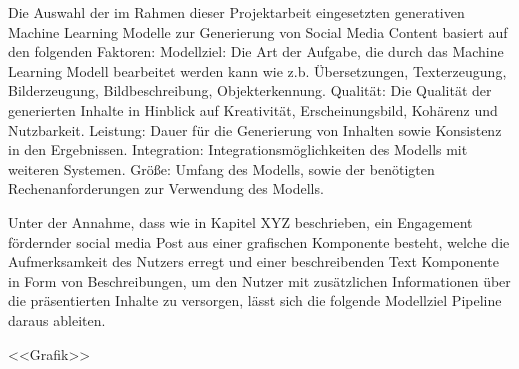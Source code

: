 Die Auswahl der im Rahmen dieser Projektarbeit eingesetzten generativen Machine Learning Modelle zur Generierung von Social Media Content basiert auf den folgenden Faktoren:
Modellziel: Die Art der Aufgabe, die durch das Machine Learning Modell bearbeitet werden kann wie z.b. Übersetzungen, Texterzeugung, Bilderzeugung, Bildbeschreibung, Objekterkennung.
Qualität: Die Qualität der generierten Inhalte in Hinblick auf Kreativität, Erscheinungsbild, Kohärenz und Nutzbarkeit.
Leistung: Dauer für die Generierung von Inhalten sowie Konsistenz in den Ergebnissen.
Integration: Integrationsmöglichkeiten des Modells mit weiteren Systemen.
Größe: Umfang des Modells, sowie der benötigten Rechenanforderungen zur Verwendung des Modells.

Unter der Annahme, dass wie in Kapitel XYZ beschrieben, ein Engagement fördernder social media Post aus einer grafischen Komponente besteht, welche die Aufmerksamkeit des Nutzers erregt und einer beschreibenden Text Komponente in Form von Beschreibungen, um den Nutzer mit zusätzlichen Informationen über die präsentierten Inhalte zu versorgen, lässt sich die folgende Modellziel Pipeline daraus ableiten.

<<Grafik>>

